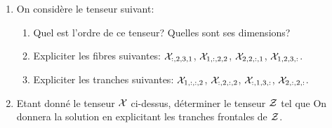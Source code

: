 \begin{enumerate}
\item On considère le tenseur suivant:
\begin{enumerate}
	\item Quel est l'ordre de ce tenseur? Quelles sont ses dimensions?
	\item Expliciter les fibres suivantes: $\mathcal{X}_{:,2,3,1}$, $\mathcal{X}_{1,:,2,2}$, $\mathcal{X}_{2,2,:,1}$, $\mathcal{X}_{1,2,3,:}$.
	\item Expliciter les tranches suivantes: $\mathcal{X}_{1,:,:,2}$, $\mathcal{X}_{:,2,:,2}$, $\mathcal{X}_{:,1,3,:}$, $\mathcal{X}_{2,:,2,:}$.
\end{enumerate}

\item Etant donné le tenseur $\mathcal{X}$ ci-dessus, déterminer le tenseur $\mathcal{Z}$ tel que
On donnera la solution en explicitant les tranches frontales de $\mathcal{Z}$.
\end{enumerate}



